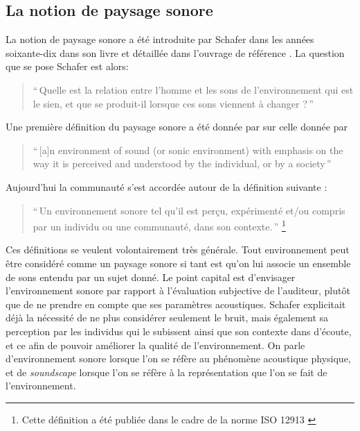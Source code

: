 \subsection{La notion de paysage sonore}

La notion de paysage sonore a été introduite par Schafer dans les années soixante-dix dans son livre \citep{schafer1969new} et détaillée dans l'ouvrage de référence \citep{schafer1977tuning}. La question que se pose Schafer est alors:

\begin{quote}
``\,Quelle est la relation entre l'homme et les sons de l'environnement qui est le sien, et que se produit-il lorsque ces sons viennent à changer ?\,''
\end{quote}

Une première définition du paysage sonore a été donnée par sur celle donnée par 

\begin{quote}
``\,[a]n environment of sound (or sonic environment) with emphasis on the way it is perceived and understood by the individual, or by a society\,'' 
\end{quote}

Aujourd'hui la communauté s'est accordée autour de la définition suivante \citep{aletta2016soundscape}:

\begin{quote}
``\,Un environnement sonore tel qu'il est perçu, expérimenté et/ou compris par un individu ou une communauté, dans son contexte.\,'' \footnote{Cette définition a été publiée dans le cadre de la norme ISO 12913 \citep{iso12913}}
\end{quote}

Ces définitions se veulent volontairement très générale. Tout environnement peut être considéré comme un paysage sonore si tant est qu'on lui associe un ensemble de sons entendu par un sujet donné. Le point capital est d'envisager l’environnement sonore par rapport à l'évaluation subjective de l'auditeur, plutôt que de ne prendre en compte que ses paramètres acoustiques. Schafer explicitait déjà la nécessité de ne plus considérer seulement le bruit, mais également sa perception par les individus qui le subissent ainsi que son contexte dans d'écoute, et ce afin de pouvoir améliorer la qualité de l'environnement. On parle d'environnement sonore lorsque l'on se réfère au phénomène acoustique physique, et de \emph{soundscape} lorsque l'on se réfère à la représentation que l'on se fait de l'environnement.

